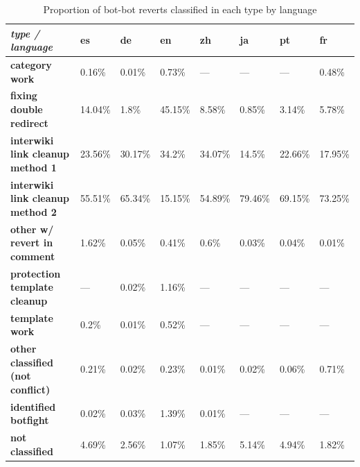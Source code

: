 \documentclass[format=acmsmall, review=false, screen=true]{acmart}%
\begin{document}
\begin{table}[H]
\centering
\begin{tabular}{|l|l|l|l|l|l|l|l|}
\hline
\textbf{\textit{type / language}}                   & \textbf{es} & \textbf{de} & \textbf{en} & \textbf{zh} & \textbf{ja} & \textbf{pt} & \textbf{fr} \\ \hline
\textbf{category work}                     & 0.16\%      & 0.01\%      & 0.73\%      & ---         & ---         & ---         & 0.48\%      \\ \hline
\textbf{fixing double redirect}            & 14.04\%     & 1.8\%       & 45.15\%     & 8.58\%      & 0.85\%      & 3.14\%      & 5.78\%      \\ \hline
\textbf{interwiki link cleanup method 1} & 23.56\%     & 30.17\%     & 34.2\%      & 34.07\%     & 14.5\%      & 22.66\%     & 17.95\%     \\ \hline
\textbf{interwiki link cleanup method 2} & 55.51\%     & 65.34\%     & 15.15\%     & 54.89\%     & 79.46\%     & 69.15\%     & 73.25\%     \\ \hline
\textbf{other w/ revert in comment}        & 1.62\%      & 0.05\%      & 0.41\%      & 0.6\%       & 0.03\%      & 0.04\%      & 0.01\%      \\ \hline
\textbf{protection template cleanup}       & ---         & 0.02\%      & 1.16\%      & ---         & ---         & ---         & ---         \\ \hline
\textbf{template work}                     & 0.2\%       & 0.01\%      & 0.52\%      & ---         & ---         & ---         & ---         \\ \hline
\textbf{other classified (not conflict)}                  & 0.21\%      & 0.02\%      & 0.23\%      & 0.01\%      & 0.02\%      & 0.06\%      & 0.71\%      \\ \hline
\textbf{identified botfight}                          & 0.02\%      & 0.03\%      & 1.39\%      & 0.01\%      & ---         & ---       & ---       \\ \hline
\textbf{not classified}                    & 4.69\%      & 2.56\%      & 1.07\%      & 1.85\%      & 5.14\%      & 4.94\%      & 1.82\%      \\ \hline
\end{tabular}
\caption{Proportion of bot-bot reverts classified in each type by language}
\label{table-type-prop}
\end{table}
\end{document}
